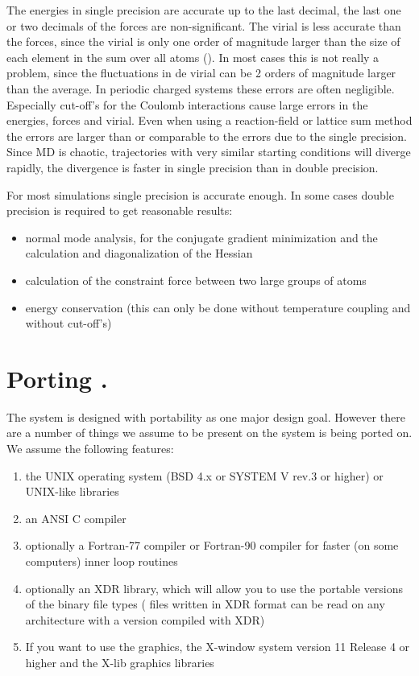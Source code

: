 The energies in single precision are accurate up to the last decimal,
the last one or two decimals of the forces are non-significant.
The virial is less accurate than the forces, since the virial is only one
order of magnitude larger than the size of each element in the sum over
all atoms ().
In most cases this is not really a problem, since the fluctuations in de
virial can be 2 orders of magnitude larger than the average.
In periodic charged systems these errors are often negligible.
Especially cut-off's for the Coulomb interactions cause large errors
in the energies, forces and virial.
Even when using a reaction-field or lattice sum method the errors
are larger than or comparable to the errors due to the single precision.
Since MD is chaotic, trajectories with very similar starting conditions will
diverge rapidly, the divergence is faster in single precision than in double
precision.

For most simulations single precision is accurate enough.
In some cases double precision is required to get reasonable results:
\begin{itemize}
\item normal mode analysis,
for the conjugate gradient minimization and the calculation and
diagonalization of the Hessian
\item calculation of the constraint force between two large groups of atoms
\item energy conservation (this can only be done without temperature coupling
and without cut-off's)
\end{itemize}

\section{Porting {\gromacs}.}
The {\gromacs} system is designed with portability as one major design
goal. However there are a number of things we assume to be present on
the system {\gromacs} is being ported on. We assume the following
features:

\begin{enumerate}
\item 	the UNIX operating system (BSD 4.x or SYSTEM V rev.3 or higher) 
	or UNIX-like libraries
\item 	an ANSI C compiler 
\item	optionally a Fortran-77 compiler or Fortran-90 compiler
	for faster (on some computers) inner loop routines
\item	optionally an XDR library, which will allow you to use the
	portable versions of the {\gromacs} binary file types
	({\gromacs} files written in XDR format can be read on any
	architecture with a {\gromacs} version compiled with XDR)
\item 	If you want to use the graphics, the X-window system version 
	11 Release 4 or higher and the X-lib graphics libraries
\end{enumerate}

